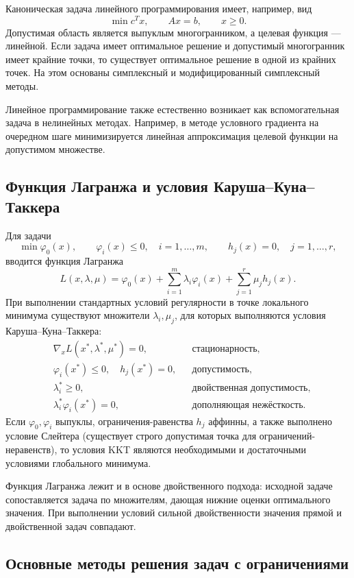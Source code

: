 Каноническая задача линейного программирования имеет, например, вид
\[
    \min c^Tx,
    \qquad Ax=b,
    \qquad x\geq0.
\]
Допустимая область является выпуклым многогранником, а целевая функция ---
линейной. Если задача имеет оптимальное решение и допустимый многогранник имеет
крайние точки, то существует оптимальное решение в одной из крайних точек. На
этом основаны симплексный и модифицированный симплексный методы.

Линейное программирование также естественно возникает как вспомогательная задача
в нелинейных методах. Например, в методе условного градиента на очередном шаге
минимизируется линейная аппроксимация целевой функции на допустимом множестве.

\subsection{Функция Лагранжа и условия Каруша--Куна--Таккера}

Для задачи
\[
    \min \varphi_0(x),
    \qquad
    \varphi_i(x)\leq0,\quad i=1,\ldots,m,
    \qquad
    h_j(x)=0,\quad j=1,\ldots,r,
\]
вводится функция Лагранжа
\[
    L(x,\lambda,\mu)
    =\varphi_0(x)+\sum_{i=1}^m\lambda_i\varphi_i(x)
      +\sum_{j=1}^r\mu_jh_j(x).
\]
При выполнении стандартных условий регулярности в точке локального минимума
существуют множители $\lambda_i,\mu_j$, для которых выполняются условия
Каруша--Куна--Таккера:
\begin{align*}
    &\nabla_xL(x^*,\lambda^*,\mu^*)=0,
        &&\text{стационарность},\\
    &\varphi_i(x^*)\leq0,\quad h_j(x^*)=0,
        &&\text{допустимость},\\
    &\lambda_i^*\geq0,
        &&\text{двойственная допустимость},\\
    &\lambda_i^*\varphi_i(x^*)=0,
        &&\text{дополняющая нежёсткость}.
\end{align*}
Если $\varphi_0,\varphi_i$ выпуклы, ограничения-равенства $h_j$ аффинны,
а также выполнено условие Слейтера (существует строго допустимая точка для
ограничений-неравенств), то условия KKT являются необходимыми и достаточными
условиями глобального минимума.

Функция Лагранжа лежит и в основе двойственного подхода: исходной задаче
сопоставляется задача по множителям, дающая нижние оценки оптимального значения.
При выполнении условий сильной двойственности значения прямой и двойственной
задач совпадают.

\subsection{Основные методы решения задач с ограничениями}

